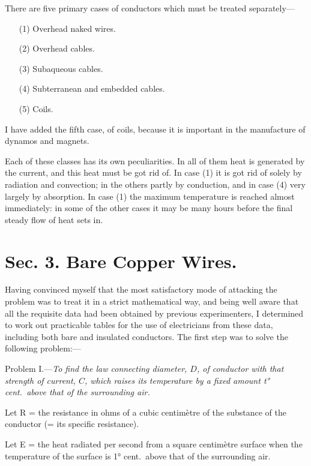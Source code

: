 \documentclass[12pt,oneside]{book}[2021/10/04]
\newenvironment{letlist}{\begin{description}[leftmargin=4em, itemindent=-2em]}{\end{description}}
\begin{document}
There are five primary cases of conductors which must be
treated separately—

\begin{itemize}[leftmargin=2cm]
\item[(1)] Overhead naked wires.
\item[(2)] Overhead cables.
\item[(3)] Subaqueous cables.
\item[(4)] Subterranean and embedded cables.
\item[(5)] Coils.
\end{itemize}

I have added the fifth case, of coils, because it is important in
the manufacture of dynamos and magnets.

Each of these classes has its own peculiarities. In all of them
heat is generated by the current, and this heat must be got rid
of. In case (1) it is got rid of solely by radiation and convection;
in the others partly by conduction, and in case (4) very largely
by absorption. In case (1) the maximum temperature is reached
almost immediately: in some of the other cases it may be many
hours before the final steady flow of heat sets in.

\section*{Sec. 3. Bare Copper Wires.}

Having convinced myself that the most satisfactory mode of
attacking the problem was to treat it in a strict mathematical
way, and being well aware that all the requisite data had been
obtained by previous experimenters, I determined to work out
practicable tables for the use of electricians from these data,
including both bare and insulated conductors. The first step was
to solve the following problem:—

Problem I.—\textit{To find the law connecting diameter, \(D\), of
conductor with that strength of current, \(C\), which raises its
temperature by a fixed amount t° cent.\ above that of the surrounding
air.}

\begin{letlist}
\item[] Let R = the resistance in ohms of a cubic centimètre of the
substance of the conductor (= its specific resistance).
\item[] Let E = the heat radiated per second from a square centimètre
surface when the temperature of the surface is 1°
cent.\ above that of the surrounding air.
\end{letlist}
\end{document}
